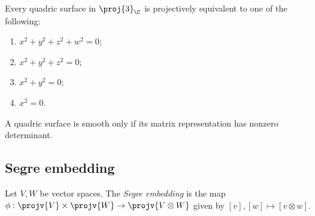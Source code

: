 \documentclass{article}
\begin{document}
\begin{theorem}
  Every quadric surface in $\proj{3}_{\C}$ is projectively equivalent to one of the following:
  \begin{enumerate}
    \item $x^2 + y^2 + z^2 + w^2 = 0$;
    \item $x^2 + y^2 + z^2 = 0$;
    \item $x^2 + y^2  = 0$;
    \item $x^2  = 0$.
  \end{enumerate}
\end{theorem}

\begin{corollary}
  A quadric surface is smooth only if its matrix representation has nonzero determinant.
\end{corollary}

\subsection{Segre embedding}

\begin{definition}
  Let $V,W$ be vector spaces. The \emph{Segre embedding} is the map
  $\phi:\projv{V}\times\projv{W} \to \projv{V\otimes W}$ given by
  $[v],[w]\mapsto [v\otimes w]$.
\end{definition}
\end{document}

